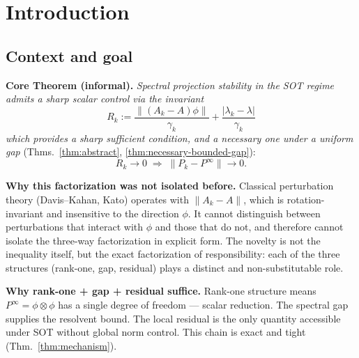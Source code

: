 \documentclass[12pt,a4paper]{amsart}
\theoremstyle{definition}
\theoremstyle{remark}
\begin{document}
\section{Introduction}
\label{sec:intro}

\subsection{Context and goal}

\begin{center}
\end{center}

\medskip
\noindent
\textbf{Core Theorem (informal).}
\emph{Spectral projection stability
in the SOT regime admits a sharp
scalar control via the invariant}
\begin{equation}\label{eq:main-principle}
  R_k :=
  \frac{\|(A_k-A)\phi\|}{\gamma_k}
  +\frac{|\lambda_k-\lambda|}{\gamma_k}
\end{equation}
\emph{which provides a sharp sufficient
condition, and a necessary one under
a uniform gap\/}
(Thms.~\ref{thm:abstract},
\ref{thm:necessary-bounded-gap}):
\[
  R_k\to 0
  \;\Longrightarrow\;
  \|P_k-P^\infty\|\to 0.
\]

\medskip
\noindent
\textbf{Why this factorization was
not isolated before.}
Classical perturbation theory
(Davis--Kahan, Kato) operates with
$\|A_k-A\|$, which is rotation-invariant
and insensitive to the direction $\phi$.
It cannot distinguish between
perturbations that interact with $\phi$
and those that do not, and therefore
cannot isolate the three-way
factorization in explicit form.
The novelty is not the inequality
itself, but the exact factorization
of responsibility: each of the three
structures (rank-one, gap, residual)
plays a distinct and non-substitutable
role.

\medskip
\noindent
\textbf{Why rank-one + gap + residual
suffice.}
Rank-one structure means
$P^\infty=\phi\otimes\phi$ has a single
degree of freedom --- scalar reduction.
The spectral gap supplies the resolvent
bound. The local residual is the only
quantity accessible under SOT without
global norm control. This chain is
exact and tight
(Thm.~\ref{thm:mechanism}).
\end{document}
